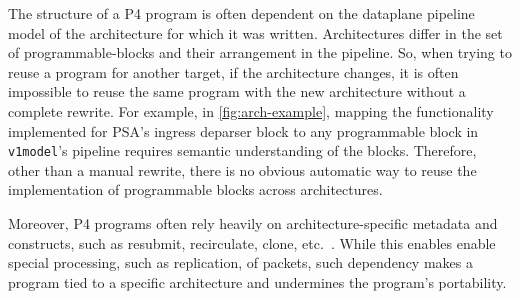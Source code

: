 \documentclass[letterpaper,twocolumn,10pt]{article}
\begin{document}

%
The structure of a P4 program is often dependent on the dataplane
pipeline model of the architecture for which it was written.
Architectures differ in the set of programmable-blocks and their
arrangement in the pipeline. So, when trying to reuse a program for
another target, if the architecture changes, it is often impossible to
reuse the same program with the new architecture without a complete
rewrite. For example, in \cref{fig:arch-example}, mapping the
functionality implemented for PSA's ingress deparser block to any
programmable block in \texttt{v1model}'s pipeline requires semantic
understanding of the blocks. Therefore, other than a manual rewrite,
there is no obvious automatic way to reuse the implementation of
programmable blocks across architectures.

Moreover, P4 programs often rely heavily on architecture-specific
metadata and constructs, such as resubmit, recirculate, clone,
etc.~\cite{simple_switch.md,psa}.  While this enables enable special
processing, such as replication, of packets, such dependency makes a
program tied to a specific architecture and undermines the program's
portability.
\end{document}
